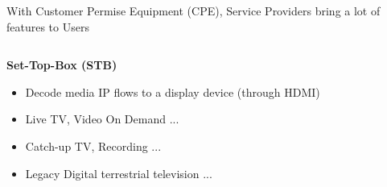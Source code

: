 \documentclass[a4paper]{beamer}
\begin{document}
\begin{frame}{With Customer Permise Equipment (CPE), Service Providers bring a lot of features to Users}
\begin{columns}[T]
		\begin{column}[T]{0.75 \textwidth} 
									
										   
			\textbf{ Set-Top-Box (STB)}
			\begin{itemize}
				\item Decode media IP flows to a display device (through HDMI)
				\item Live TV, Video On Demand ...
				\item Catch-up TV, Recording ...
				\item Legacy Digital terrestrial television ...
			\end{itemize}
										     
									
		\end{column}
						
	\end{columns}
			
			
			
\end{frame}

\end{document}

